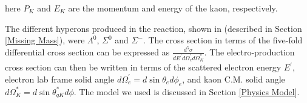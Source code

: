\noindent
here $P_K$ and $E_K$ are the momentum and energy of the kaon, respectively.

The different hyperons produced in the reaction, shown in (described in Section \ref{Missing Mass}), were $\Lambda^0$, $\Sigma^0$ and $\Sigma^-$. The cross section in terms of the five-fold differential cross section can be expressed as $\frac{d^5\sigma}{dE^\prime d\Omega^\prime_e d\Omega^*_K}$. The electro-production cross section can then be written in terms of the scattered electron energy $E^\prime$, electron lab frame solid angle $d\Omega_e^\prime = d\sin\theta_e d\phi_e$, and kaon C.M. solid angle $d\Omega_K^* = d\sin\theta_{qK}^* d\phi$. The model we used is discussed in Section \ref{Physics Model}.